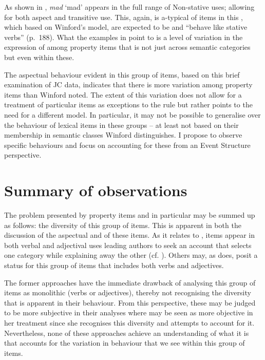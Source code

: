As shown in , \textit{mad} `mad' appears in the full range of
Non-stative uses; allowing for both  aspect and transitive
use.  This, again, is a-typical of items in this ,
which based on Winford’s model, are expected to be  and ``behave
like stative verbs” (p.~188).  What the examples in  point to is a level of variation in the expression of  among property
items that is not just across semantic categories but even within these.

The aspectual behaviour evident in this group of items, based on this
brief examination of JC data, indicates that there is more variation among property items than Winford noted.  The extent of this variation
does not allow for a treatment of particular items as exceptions to
the rule but rather points to the need for a different model.  In
particular, it may not be possible to generalise over the behaviour of
lexical items in these groups -- at least not based on their membership
in semantic classes Winford distinguishes.  I propose to observe
specific behaviours and focus on accounting for these from an Event
Structure perspective.


\section{Summary of observations}\label{sec:3.4}

The problem presented by property items and  in
particular may be summed up as follows: the diversity of this group of
items.  This is apparent in both the discussion of the aspectual and
 of these items.  As it relates to ,
items appear in both verbal and adjectival uses leading authors to
seek an account that selects one category while explaining away the
other (cf. \citealt{Sebba1986,Seuren1986}).  Others may, as
\citet{Kouwenberg1996} does, posit a status for this group of items
that includes both verbs and adjectives.

The former approaches have the immediate drawback of analysing this
group of items as monolithic (verbs or adjectives), thereby not
recognising the diversity that is apparent in their behaviour.  From
this perspective, these may be judged to be more subjective in their
analyses where \citet{Kouwenberg1996} may be seen as more objective in
her treatment since she recognises this diversity and attempts to
account for it.  Nevertheless, none of these approaches achieve an
understanding of what it is that accounts for the variation in
behaviour that we see within this group of items.

